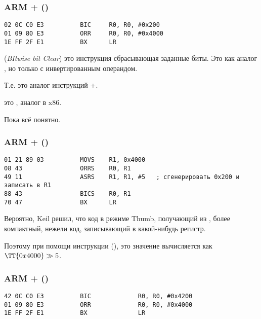 \subsubsection{ARM + \OptimizingKeilVI (\ARMMode)}

\begin{lstlisting}[caption=\OptimizingKeilVI (\ARMMode),style=customasmARM]
02 0C C0 E3          BIC     R0, R0, #0x200
01 09 80 E3          ORR     R0, R0, #0x4000
1E FF 2F E1          BX      LR
\end{lstlisting}

 (\emph{BItwise bit Clear}) это инструкция сбрасывающая заданные биты. 
Это как аналог \AND, но только с инвертированным операндом.

Т.е. это аналог инструкций \NOT+\AND.

 это , аналог \OR в x86.

Пока всё понятно.

\subsubsection{ARM + \OptimizingKeilVI (\ThumbMode)}

\begin{lstlisting}[caption=\OptimizingKeilVI (\ThumbMode),style=customasmARM]
01 21 89 03          MOVS    R1, 0x4000
08 43                ORRS    R0, R1
49 11                ASRS    R1, R1, #5   ; сгенерировать 0x200 и записать в R1
88 43                BICS    R0, R1
70 47                BX      LR
\end{lstlisting}

Вероятно, Keil решил, что код в режиме Thumb,
получающий  из , 
более компактный, нежели код, 
записывающий  в какой-нибудь регистр.

Поэтому при помощи инструкции  (\ASRdesc), это значение вычисляется как $\TT{0x4000} \gg 5$.

\subsubsection{ARM + \OptimizingXcodeIV (\ARMMode)}
\label{anomaly:LLVM}
\myindex{\CompilerAnomaly}

\begin{lstlisting}[caption=\OptimizingXcodeIV (\ARMMode),label=ARM_leaf_example3,style=customasmARM]
42 0C C0 E3          BIC             R0, R0, #0x4200
01 09 80 E3          ORR             R0, R0, #0x4000
1E FF 2F E1          BX              LR
\end{lstlisting}

